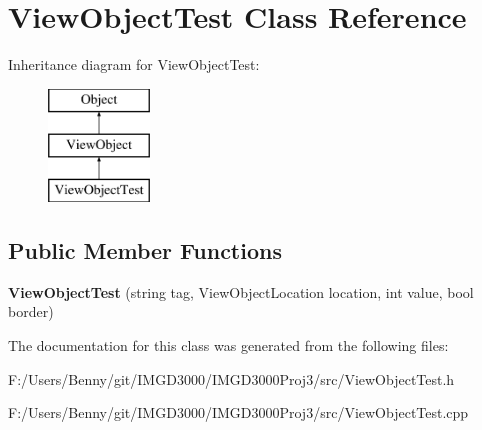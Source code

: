 \hypertarget{class_view_object_test}{\section{View\+Object\+Test Class Reference}
\label{class_view_object_test}
}
Inheritance diagram for View\+Object\+Test\+:\begin{figure}[H]
\begin{center}
\leavevmode
\includegraphics[height=3.000000cm]{class_view_object_test}
\end{center}
\end{figure}
\subsection*{Public Member Functions}
\begin{DoxyCompactItemize}
\item 
\hypertarget{class_view_object_test_a04e1dbee01b324457977c776769b94dc}{{\bfseries View\+Object\+Test} (string tag, View\+Object\+Location location, int value, bool border)}\label{class_view_object_test_a04e1dbee01b324457977c776769b94dc}

\end{DoxyCompactItemize}


The documentation for this class was generated from the following files\+:\begin{DoxyCompactItemize}
\item 
F\+:/\+Users/\+Benny/git/\+I\+M\+G\+D3000/\+I\+M\+G\+D3000\+Proj3/src/View\+Object\+Test.\+h\item 
F\+:/\+Users/\+Benny/git/\+I\+M\+G\+D3000/\+I\+M\+G\+D3000\+Proj3/src/View\+Object\+Test.\+cpp\end{DoxyCompactItemize}
